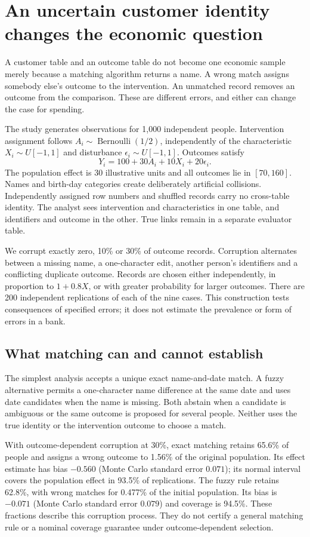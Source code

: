 \chapter{An uncertain customer identity changes the economic question}
\label{gap29:observation}
A customer table and an outcome table do not become one economic sample merely
because a matching algorithm returns a name. A wrong match assigns somebody
else's outcome to the intervention. An unmatched record removes an outcome
from the comparison. These are different errors, and either can change the
case for spending.

The study generates observations for 1,000 independent people. Intervention
assignment follows $A_i\sim\operatorname{Bernoulli}(1/2)$, independently of
the characteristic $X_i\sim U[-1,1]$ and disturbance
$\epsilon_i\sim U[-1,1]$. Outcomes satisfy
\[
 Y_i=100+30A_i+10X_i+20\epsilon_i.
\]
The population effect is 30 illustrative units and all outcomes lie in
$[70,160]$. Names and birth-day categories create deliberately artificial
collisions. Independently assigned row numbers and shuffled records carry
no cross-table identity. The analyst sees intervention and characteristics
in one table, and identifiers and outcome in the other. True links remain
in a separate evaluator table.

We corrupt exactly zero, 10\% or 30\% of outcome records. Corruption alternates
between a missing name, a one-character edit, another person's identifiers
and a conflicting duplicate outcome. Records are chosen either independently,
in proportion to $1+0.8X$, or with greater probability for larger outcomes.
There are 200 independent replications of each of the nine cases.
This construction tests consequences of specified errors; it does not
estimate the prevalence or form of errors in a bank.

\section{What matching can and cannot establish}
The simplest analysis accepts a unique exact name-and-date match. A fuzzy
alternative permits a one-character name difference at the same date and
uses date candidates when the name is missing. Both abstain when a candidate
is ambiguous or the same outcome is proposed for several people. Neither
uses the true identity or the intervention outcome to choose a match.

With outcome-dependent corruption at 30\%, exact matching retains 65.6\%
of people and assigns a wrong outcome to 1.56\% of the original population.
Its effect estimate has bias $-0.560$ (Monte Carlo standard error $0.071$);
its normal interval covers the population effect in 93.5\% of replications.
The fuzzy rule retains 62.8\%, with wrong matches for 0.477\% of the initial
population. Its bias is $-0.071$ (Monte Carlo standard error $0.079$) and
coverage is 94.5\%. These fractions describe this corruption process.
They do not certify a general matching rule or a nominal coverage guarantee
under outcome-dependent selection.

